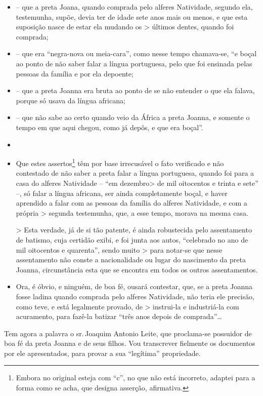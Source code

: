 \begin{itemize}
\item
  -- que a preta Joana, quando comprada pelo alferes Natividade, segundo
  ela, testemunha, supõe, devia ter de idade sete anos mais ou menos, e
  que esta suposição nasce de estar ela mudando os \textgreater{}
  últimos dentes, quando foi comprada;
\item
  -- que era ``negra-nova ou meia-cara'', como nesse tempo chamava-se, ``e
  boçal ao ponto de não saber falar a língua portuguesa, pelo que foi
  ensinada pelas pessoas da família e por ela depoente;
\item
  -- que a preta Joanna era bruta ao ponto de se não entender o que ela
  falava, porque só usava da língua africana;
\item
  -- que não sabe ao certo quando veio da África a preta Joanna, e
  somente o tempo em que aqui chegou, como já depôs, e que era boçal''.
\item
\item
  Que estes assertos\footnote{ Embora no original esteja com ``c'', no
    que não está incorreto, adaptei para a forma como se acha, que
    designa asserção, afirmativa.} têm por base irrecusável o fato
  verificado e não contestado de não saber a preta falar a língua
  portuguesa, quando foi para a casa do alferes Natividade -- ``em
  dezembro\textgreater{} de mil oitocentos e trinta e sete'' --, só
  falar a língua africana, ser ainda completamente boçal, e haver
  aprendido a falar com as pessoas da família do alferes Natividade, e
  com a própria \textgreater{} segunda testemunha, que, a esse tempo,
  morava na mesma casa.

  \textgreater{} Esta verdade, já de si tão patente, é ainda robustecida
  pelo assentamento de batismo, cuja certidão exibi, e foi junta aos
  autos, ``celebrado no ano de mil oitocentos e quarenta'', sendo muito
  \textgreater{} para notar-se que nesse assentamento não conste a
  nacionalidade ou lugar do nascimento da preta Joanna, circunstância
  esta que se encontra em todos os outros assentamentos.
\item
  Ora, é óbvio, e ninguém, de boa fé, ousará contestar, que, se a preta
  Joanna fosse ladina quando comprada pelo alferes Natividade, não teria
  ele precisão, como teve, e está legalmente provado, de \textgreater{}
  instrui-la e industriá-la com acuramento, para fazê-la batizar ``três
  anos depois de comprada''\ldots{}
\end{itemize}

Tem agora a palavra o sr.\,Joaquim Antonio Leite, que proclama-se
possuidor de boa fé da preta Joanna e de seus filhos. Vou transcrever
fielmente os documentos por ele apresentados, para provar a sua
``legítima'' propriedade.

